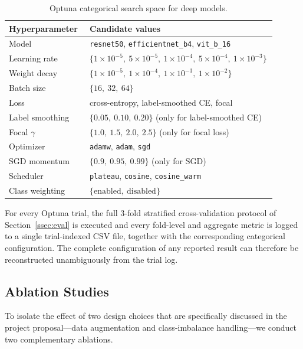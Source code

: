 \documentclass[conference]{IEEEtran}
\begin{document}
\begin{table}[t]
\centering
\caption{Optuna categorical search space for deep models.}
\label{tab:search_space}
\renewcommand{\arraystretch}{1.2}
\begin{tabular}{p{0.30\linewidth}p{0.60\linewidth}}
\toprule
\textbf{Hyperparameter} & \textbf{Candidate values} \\
\midrule
Model              & \texttt{resnet50}, \texttt{efficientnet\_b4}, \texttt{vit\_b\_16} \\
Learning rate      & $\{1{\times}10^{-5},\ 5{\times}10^{-5},\ 1{\times}10^{-4},\ 5{\times}10^{-4},\ 1{\times}10^{-3}\}$ \\
Weight decay       & $\{1{\times}10^{-5},\ 1{\times}10^{-4},\ 1{\times}10^{-3},\ 1{\times}10^{-2}\}$ \\
Batch size         & $\{16,\ 32,\ 64\}$ \\
Loss               & cross-entropy, label-smoothed CE, focal \\
Label smoothing    & $\{0.05,\ 0.10,\ 0.20\}$ (only for label-smoothed CE) \\
Focal $\gamma$     & $\{1.0,\ 1.5,\ 2.0,\ 2.5\}$ (only for focal loss) \\
Optimizer          & \texttt{adamw}, \texttt{adam}, \texttt{sgd} \\
SGD momentum       & $\{0.9,\ 0.95,\ 0.99\}$ (only for SGD) \\
Scheduler          & \texttt{plateau}, \texttt{cosine}, \texttt{cosine\_warm} \\
Class weighting    & $\{\text{enabled},\ \text{disabled}\}$ \\
\bottomrule
\end{tabular}
\end{table}

For every Optuna trial, the full 3-fold stratified cross-validation protocol of Section~\ref{ssec:eval} is executed and every fold-level and aggregate metric is logged to a single trial-indexed CSV file, together with the corresponding categorical configuration. The complete configuration of any reported result can therefore be reconstructed unambiguously from the trial log.

\subsection{Ablation Studies}
\label{ssec:ablation}

To isolate the effect of two design choices that are specifically discussed in the project proposal---data augmentation and class-imbalance handling---we conduct two complementary ablations.
\end{document}
